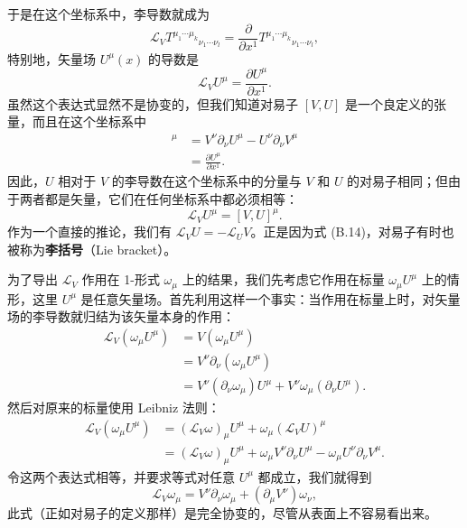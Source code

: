 于是在这个坐标系中，李导数就成为
\begin{equation*}
\mathcal{L}_V T^{\mu_1\cdots\mu_k}{}_{\nu_1\cdots\nu_l}
= \frac{\partial}{\partial x^1} T^{\mu_1\cdots\mu_k}{}_{\nu_1\cdots\nu_l},
\tag{B.11}
\end{equation*}
特别地，矢量场 $U^\mu(x)$ 的导数是
\begin{equation*}
\mathcal{L}_V U^\mu = \frac{\partial U^\mu}{\partial x^1}.
\tag{B.12}
\end{equation*}
虽然这个表达式显然不是协变的，但我们知道对易子 $[V, U]$ 是一个良定义的张量，而且在这个坐标系中
\begin{align*}
[V, U]^\mu &= V^\nu \partial_\nu U^\mu - U^\nu \partial_\nu V^\mu \\
&= \frac{\partial U^\mu}{\partial x^1}. \tag{B.13}
\end{align*}
因此，$U$ 相对于 $V$ 的李导数在这个坐标系中的分量与 $V$ 和 $U$ 的对易子相同；但由于两者都是矢量，它们在任何坐标系中都必须相等：
\begin{equation*}
\mathcal{L}_V U^\mu = [V, U]^\mu.
\tag{B.14}
\end{equation*}
作为一个直接的推论，我们有 $\mathcal{L}_V U = -\mathcal{L}_U V$。正是因为式 (B.14)，对易子有时也被称为\textbf{李括号}（Lie bracket）。

为了导出 $\mathcal{L}_V$ 作用在 1-形式 $\omega_\mu$ 上的结果，我们先考虑它作用在标量 $\omega_\mu U^\mu$ 上的情形，这里 $U^\mu$ 是任意矢量场。首先利用这样一个事实：当作用在标量上时，对矢量场的李导数就归结为该矢量本身的作用：
\begin{align*}
\mathcal{L}_V (\omega_\mu U^\mu) &= V(\omega_\mu U^\mu) \\
&= V^\nu \partial_\nu (\omega_\mu U^\mu) \\
&= V^\nu (\partial_\nu \omega_\mu) U^\mu + V^\nu \omega_\mu (\partial_\nu U^\mu). \tag{B.15}
\end{align*}
然后对原来的标量使用 Leibniz 法则：
\begin{align*}
\mathcal{L}_V (\omega_\mu U^\mu) &= (\mathcal{L}_V \omega)_\mu U^\mu + \omega_\mu (\mathcal{L}_V U)^\mu \\
&= (\mathcal{L}_V \omega)_\mu U^\mu + \omega_\mu V^\nu \partial_\nu U^\mu - \omega_\mu U^\nu \partial_\nu V^\mu. \tag{B.16}
\end{align*}
令这两个表达式相等，并要求等式对任意 $U^\mu$ 都成立，我们就得到
\begin{equation*}
\mathcal{L}_V \omega_\mu = V^\nu \partial_\nu \omega_\mu + (\partial_\mu V^\nu) \omega_\nu,
\tag{B.17}
\end{equation*}
此式（正如对易子的定义那样）是完全协变的，尽管从表面上不容易看出来。

